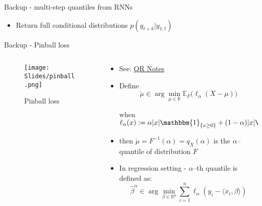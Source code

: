 \documentclass[usenames,dvipsnames]{beamer}
\theoremstyle{definition}
\begin{document}
\begin{frame}{Backup - multi-step quantiles from RNNs}
    \begin{itemize}
        \item Return full conditional distributions $p(y_{t + k} | y_{1:t})$
        
    \end{itemize}
\end{frame}

\begin{frame}{Backup - Pinball loss}
\begin{columns}
\begin{column}{0.48\textwidth}
    \begin{figure}
        \centering
        \texttt{[image: Slides/pinball.png]}
        \caption{Pinball loss}
        \label{fig:pblloss}
    \end{figure}
\end{column}
\begin{column}{0.56\textwidth}  %
    \begin{itemize}
        \item See: \href{https://josephsalmon.eu/enseignement/UW/STAT593/QuantileRegression.pdf}{QR Notes}
        \item Define $$\check{\mu}\in\operatorname{arg}\min_{\mu\in\mathbb{R}}\mathbb{E}_{F}\big(\ell_{\alpha}(X-\mu)\big)$$

        when $\ell_{\alpha}(x):=\alpha|x|\mathbbm{1}_{\{x\geq0\}}+(1-\alpha)|x|\mathbbm{1}_{\{x\leq0\}}$
        
        \item then $\check{\mu} = F^{-1}(\alpha) = q_{X}(\alpha)$ is the $\alpha$--quantile of distribution $F$
        \item In regression setting - $\alpha$--th quantile is defined as:
        $$\hat{\beta}^{\alpha}\in\arg\min_{\beta\in\mathbb{R}^{p}}\sum_{i=1}^{n}\ell_{\alpha}(y_{i}-\langle x_{i},\beta\rangle)$$
    \end{itemize}
\end{column}
\end{columns}
\end{frame}
\end{document}
